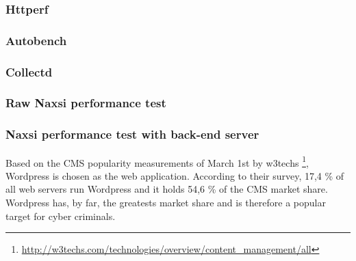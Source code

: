 \documentclass[Methods]{subfiles}
\begin{document}
\subsubsection{Httperf}


\subsubsection{Autobench}


\subsubsection{Collectd}


\subsubsection{Raw Naxsi performance test}

\subsubsection{Naxsi performance test with back-end server}
Based on the \ac{CMS} popularity measurements of March 1st by w3techs \footnote{\url{http://w3techs.com/technologies/overview/content_management/all}}, Wordpress is chosen as the web application. According to their survey, 17,4 \% of all web servers run Wordpress and it holds 54,6 \% of the CMS market share. Wordpress has, by far, the greatests market share and is therefore a popular target for cyber criminals.
\end{document}
